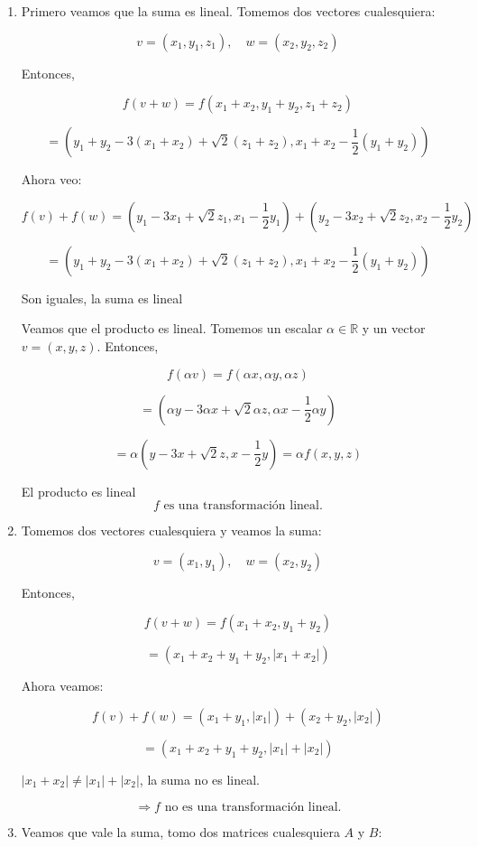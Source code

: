 \begin{enumerate}[label=(\alph*)]
  \item
  Primero veamos que la suma es lineal. Tomemos dos vectores cualesquiera: 
  
  \[
  v = (x_1, y_1, z_1), \quad w = (x_2, y_2, z_2)
  \]
  
  Entonces,
  
  \[
  f(v + w) = f(x_1 + x_2, y_1 + y_2, z_1 + z_2)
  \]
  
  \[
  = (y_1 + y_2 - 3(x_1 + x_2) + \sqrt{2} (z_1 + z_2), x_1 + x_2 - \frac{1}{2} (y_1 + y_2))
  \]
  
  Ahora veo:
  
  \[
  f(v) + f(w) = (y_1 - 3x_1 + \sqrt{2} z_1, x_1 - \frac{1}{2} y_1) + (y_2 - 3x_2 + \sqrt{2} z_2, x_2 - \frac{1}{2} y_2)
  \]
  
  \[
  = (y_1 + y_2 - 3(x_1 + x_2) + \sqrt{2} (z_1 + z_2), x_1 + x_2 - \frac{1}{2} (y_1 + y_2))
  \]
  
  Son iguales, la suma es lineal
  
  Veamos que el producto es lineal. Tomemos un escalar $\alpha \in \mathbb{R}$ y un vector $v = (x, y, z)$. Entonces,
  
  \[
  f(\alpha v) = f(\alpha x, \alpha y, \alpha z)
  \]
  
  \[
  = (\alpha y - 3\alpha x + \sqrt{2} \alpha z, \alpha x - \frac{1}{2} \alpha y)
  \]
  
  \[
  = \alpha (y - 3x + \sqrt{2}z, x - \frac{1}{2} y) = \alpha f(x, y, z)
  \]
  
  El producto es lineal
  \[
  f \text{ es una transformación lineal.}
  \]
  \newpage
  \item 
  Tomemos dos vectores cualesquiera y veamos la suma: 

\[
v = (x_1, y_1), \quad w = (x_2, y_2)
\]

Entonces,

\[
f(v + w) = f(x_1 + x_2, y_1 + y_2)
\]

\[
= (x_1 + x_2 + y_1 + y_2, |x_1 + x_2|)
\]

Ahora veamos:

\[
f(v) + f(w) = (x_1 + y_1, |x_1|) + (x_2 + y_2, |x_2|)
\]

\[
= (x_1 + x_2 + y_1 + y_2, |x_1| + |x_2|)
\]

$|x_1 + x_2| \neq |x_1| + |x_2|$, la suma no es lineal.

\[
\Rightarrow f \text{ no es una transformación lineal.}
\]
  \item Veamos que vale la suma, tomo dos matrices cualesquiera $A$ y $B$:


\end{enumerate}
